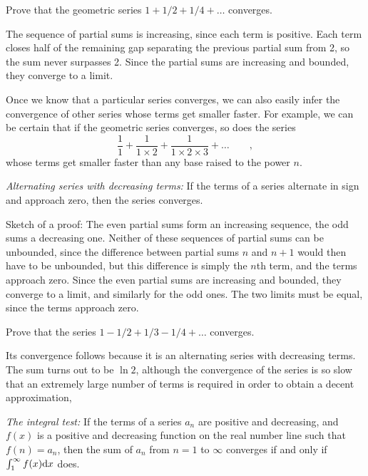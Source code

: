 \begin{eg}
\egquestion Prove that the geometric series
$1+1/2+1/4+\ldots$ converges.

\eganswer The sequence of partial sums is increasing, since each term is positive.
Each term closes half of the remaining gap separating the previous partial sum from 2,
so the sum never surpasses 2. Since the partial sums are increasing and bounded,
they converge to a limit.
\end{eg}

Once we know that a particular series converges, we can also easily infer the convergence
of other series whose terms get smaller faster. For example, we can be certain
that if the geometric series converges, so does the series
\begin{equation*}
  \frac{1}{1} + \frac{1}{1\times 2} + \frac{1}{1\times 2 \times 3} +\ldots \qquad ,
\end{equation*}
whose terms get smaller faster than any base raised to the power $n$.

\emph{Alternating series with decreasing terms\/:} If the terms of a series alternate
in sign and approach zero, then the series converges.

Sketch of a proof: The even partial sums form an increasing sequence, the odd sums a decreasing one.
Neither of these sequences of partial sums can be unbounded, since the difference between partial
sums $n$ and $n+1$ would then have to be unbounded, but this difference is simply the $n$th term,
and the terms approach zero. Since the even
partial sums are increasing and bounded, they converge to a limit, and similarly for the odd ones.
The two limits must be equal, since the terms approach zero.

\begin{eg}
\egquestion Prove that the series $1-1/2+1/3-1/4+\ldots$ converges.

\eganswer Its convergence follows because it is an alternating series with decreasing terms.
The sum turns out to be $\ln 2$, although the convergence of the series is so slow that
an extremely large number of terms is required in order to obtain a decent approximation,
\end{eg}

\emph{The integral test\/:} If the terms of a series $a_n$ are positive and decreasing, and $f(x)$ is a positive and decreasing function
on the real number line such that $f(n)=a_n$, then the sum of $a_n$ from $n=1$ to $\infty$ converges if and only if
$\int_1^\infty f(x)\textup{d} x$ does.

